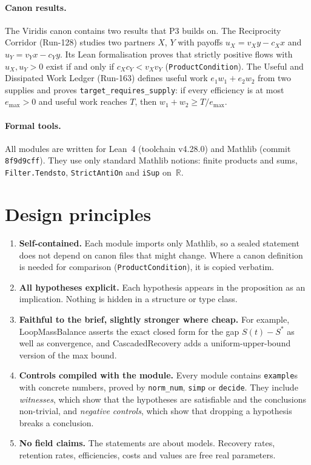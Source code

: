 \documentclass[11pt]{article}
\theoremstyle{remark}
\begin{document}
\paragraph{Canon results.}
The Viridis canon contains two results that P3 builds on. The Reciprocity Corridor (Run-128)
\citep{hart2026reciprocity} studies two partners $X$, $Y$ with payoffs $u_X = v_X y - c_X x$ and
$u_Y = v_Y x - c_Y y$. Its Lean formalisation proves that strictly positive flows with
$u_X,u_Y>0$ exist if and only if $c_Xc_Y<v_Xv_Y$ (\texttt{ProductCondition}). The Useful and
Dissipated Work Ledger (Run-163) \citep{hart2026udwl} defines useful work
$e_1w_1+e_2w_2$ from two supplies and proves \texttt{target\_requires\_supply}: if every
efficiency is at most $e_{\max}>0$ and useful work reaches $T$, then $w_1+w_2\ge T/e_{\max}$.

\paragraph{Formal tools.}
All modules are written for Lean~4 \citep{moura2021lean4} (toolchain v4.28.0) and Mathlib
\citep{mathlib2020} (commit \texttt{8f9d9cff}). They use only standard Mathlib notions: finite
products and sums, \texttt{Filter.Tendsto}, \texttt{StrictAntiOn} and \texttt{iSup} on~$\mathbb{R}$.

\section{Design principles}
\label{sec:design}
\begin{enumerate}
\item \textbf{Self-contained.} Each module imports only Mathlib, so a sealed statement does not
depend on canon files that might change. Where a canon definition is needed for comparison
(\texttt{ProductCondition}), it is copied verbatim.
\item \textbf{All hypotheses explicit.} Each hypothesis appears in the proposition as an
implication. Nothing is hidden in a structure or type class.
\item \textbf{Faithful to the brief, slightly stronger where cheap.} For example, LoopMassBalance
asserts the exact closed form for the gap $S(t)-S^\ast$ as well as convergence, and
CascadedRecovery adds a uniform-upper-bound version of the max bound.
\item \textbf{Controls compiled with the module.} Every module contains \texttt{example}s with
concrete numbers, proved by \texttt{norm\_num}, \texttt{simp} or \texttt{decide}. They include
\emph{witnesses}, which show that the hypotheses are satisfiable and the conclusions
non-trivial, and \emph{negative controls}, which show that dropping a hypothesis breaks a
conclusion.
\item \textbf{No field claims.} The statements are about models. Recovery rates, retention
rates, efficiencies, costs and values are free real parameters.
\end{enumerate}
\end{document}
